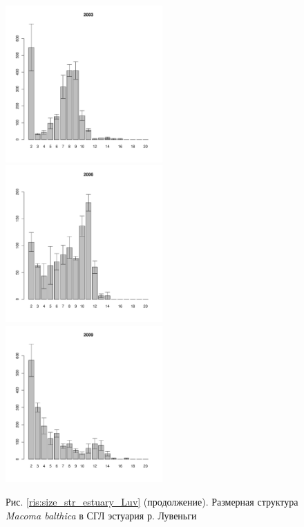 \documentclass[12pt, a4paper]{article}
\begin{document}
\begin{figure}[h]
\begin{multicols}{3}
\hfill
\includegraphics[width=60mm]{../White_Sea/Estuatiy_Luvenga/sizestr2_2003_.pdf}
\hfill
\includegraphics[width=60mm]{../White_Sea/Estuatiy_Luvenga/sizestr2_2006_.pdf}
\hfill
\includegraphics[width=60mm]{../White_Sea/Estuatiy_Luvenga/sizestr2_2009_.pdf}
\end{multicols}



\begin{center}
Рис. \ref{ris:size_str_estuary_Luv} (продолжение). Размерная структура {\it Macoma balthica} в СГЛ эстуария р. Лувеньги

\end{center}
\end{figure}
\end{document}
